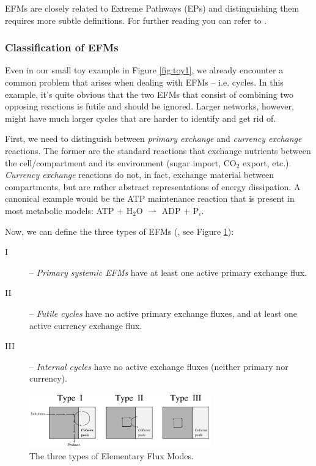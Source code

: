 \documentclass[10pt,a4paper]{article}
\begin{document}
EFMs are closely related to Extreme Pathways (EPs) and distinguishing them requires more subtle definitions. For further reading you can refer to \cite{klamt_two_2003}.

\subsubsection{Classification of EFMs}
Even in our small toy example in Figure \ref{fig:toy1}, we already encounter a common problem that arises when dealing with EFMs -- i.e. cycles. In this example, it's quite obvious that the two EFMs that consist of combining two opposing reactions is futile and should be ignored. Larger networks, however, might have much larger cycles that are harder to identify and get rid of.

First, we need to distinguish between \textit{primary exchange} and \textit{currency exchange} reactions. The former are the standard reactions that exchange nutrients between the cell/compartment and its environment (sugar import, CO$_2$ export, etc.). \textit{Currency exchange} reactions do not, in fact, exchange material between compartments, but are rather abstract representations of energy dissipation. A canonical example would be the ATP maintenance reaction that is present in most metabolic models: ATP + H$_2$O $\rightharpoonup$ ADP + P$_i$.

Now, we can define the three types of EFMs (\cite{price_extreme_2002}, see Figure \ref{fig:efm_types}):
\begin{description}
	\item[I] -- \textit{Primary systemic EFMs} have at least one active primary exchange flux.
	\item[II] -- \textit{Futile cycles} have no active primary exchange fluxes, and at least one active currency exchange flux.
	\item[III] -- \textit{Internal cycles} have no active exchange fluxes (neither primary nor currency). 
\end{description}

\begin{figure}[ht!]
	\begin{center}	\includegraphics[width=0.7\textwidth]{extreme_pathway_types}
	\caption{The three types of Elementary Flux Modes.}\label{fig:efm_types}
	\end{center}
\end{figure}
\end{document}
